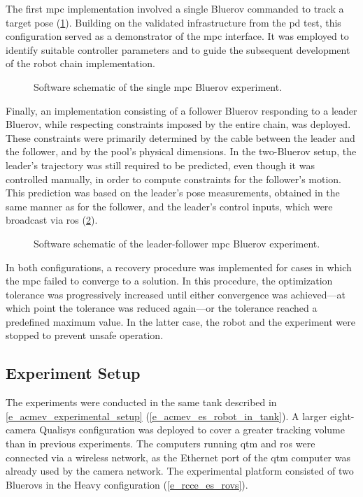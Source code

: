 The first \ac{mpc} implementation involved a single Bluerov commanded to track a target pose
(\cref{e_rcce_ctcl_mpc_diagram}). Building on the validated infrastructure from the \ac{pd} test,
this configuration served as a demonstrator of the \ac{mpc} interface. It was employed to identify
suitable controller parameters and to guide the subsequent development of the robot chain
implementation.

\begin{figure}
	\centering
	\caption{Software schematic of the single \ac{mpc} Bluerov experiment.}
	\label{e_rcce_ctcl_mpc_diagram}
\end{figure}

Finally, an implementation consisting of a follower Bluerov responding to a leader Bluerov, while
respecting constraints imposed by the entire chain, was deployed. These constraints were primarily
determined by the cable between the leader and the follower, and by the pool's physical dimensions.
In the two-Bluerov setup, the leader's trajectory was still required to be predicted, even though
it was controlled manually, in order to compute constraints for the follower's motion. This
prediction was based on the leader's pose measurements, obtained in the same manner as for the
follower, and the leader's control inputs, which were broadcast via \ac{ros}
(\cref{e_rcce_ctcl_mpc_leader_follower_diagram}).

\begin{figure}
	\centering
	\caption{Software schematic of the leader-follower \ac{mpc} Bluerov experiment.}
	\label{e_rcce_ctcl_mpc_leader_follower_diagram}
\end{figure}

In both configurations, a recovery procedure was implemented for cases in which the \ac{mpc} failed
to converge to a solution. In this procedure, the optimization tolerance was progressively
increased until either convergence was achieved—at which point the tolerance was reduced again—or
the tolerance reached a predefined maximum value. In the latter case, the robot and the experiment
were stopped to prevent unsafe operation.

\subsection{Experiment Setup}
\label{ex_rcce_experiment_setup}

The experiments were conducted in the same tank described in \cref{e_acmev_experimental_setup}
(\cref{e_acmev_es_robot_in_tank}). A larger eight-camera Qualisys configuration was deployed to
cover a greater tracking volume than in previous experiments. The computers running \ac{qtm} and
\ac{ros} were connected via a wireless network, as the Ethernet port of the \ac{qtm} computer was
already used by the camera network. The experimental platform consisted of two Bluerovs in the
Heavy configuration (\cref{e_rcce_es_rovs}).

